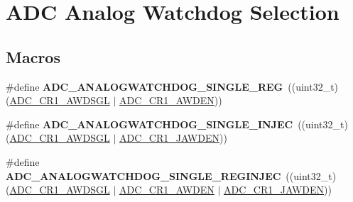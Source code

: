 \hypertarget{group___a_d_c__analog__watchdog__selection}{}\section{A\+DC Analog Watchdog Selection}
\label{group___a_d_c__analog__watchdog__selection}
\subsection*{Macros}
\begin{DoxyCompactItemize}
\item 
\mbox{\label{group___a_d_c__analog__watchdog__selection_gad4cf176e721fd2382fbc7937e352db67}} 
\#define {\bfseries A\+D\+C\+\_\+\+A\+N\+A\+L\+O\+G\+W\+A\+T\+C\+H\+D\+O\+G\+\_\+\+S\+I\+N\+G\+L\+E\+\_\+\+R\+EG}~((uint32\+\_\+t)(\mbox{\hyperlink{group___peripheral___registers___bits___definition_ga5c9fc31f19c04033dfa98e982519c451}{A\+D\+C\+\_\+\+C\+R1\+\_\+\+A\+W\+D\+S\+GL}} $\vert$ \mbox{\hyperlink{group___peripheral___registers___bits___definition_ga6e006d43fcb9fe1306745c95a1bdd651}{A\+D\+C\+\_\+\+C\+R1\+\_\+\+A\+W\+D\+EN}}))
\item 
\mbox{\label{group___a_d_c__analog__watchdog__selection_ga47d8850a833f799ceb433491a3d6659c}} 
\#define {\bfseries A\+D\+C\+\_\+\+A\+N\+A\+L\+O\+G\+W\+A\+T\+C\+H\+D\+O\+G\+\_\+\+S\+I\+N\+G\+L\+E\+\_\+\+I\+N\+J\+EC}~((uint32\+\_\+t)(\mbox{\hyperlink{group___peripheral___registers___bits___definition_ga5c9fc31f19c04033dfa98e982519c451}{A\+D\+C\+\_\+\+C\+R1\+\_\+\+A\+W\+D\+S\+GL}} $\vert$ \mbox{\hyperlink{group___peripheral___registers___bits___definition_ga4886de74bcd3a1e545094089f76fd0b3}{A\+D\+C\+\_\+\+C\+R1\+\_\+\+J\+A\+W\+D\+EN}}))
\item 
\mbox{\label{group___a_d_c__analog__watchdog__selection_gaa0c246b49622fa85c7df6e11f583dffb}} 
\#define {\bfseries A\+D\+C\+\_\+\+A\+N\+A\+L\+O\+G\+W\+A\+T\+C\+H\+D\+O\+G\+\_\+\+S\+I\+N\+G\+L\+E\+\_\+\+R\+E\+G\+I\+N\+J\+EC}~((uint32\+\_\+t)(\mbox{\hyperlink{group___peripheral___registers___bits___definition_ga5c9fc31f19c04033dfa98e982519c451}{A\+D\+C\+\_\+\+C\+R1\+\_\+\+A\+W\+D\+S\+GL}} $\vert$ \mbox{\hyperlink{group___peripheral___registers___bits___definition_ga6e006d43fcb9fe1306745c95a1bdd651}{A\+D\+C\+\_\+\+C\+R1\+\_\+\+A\+W\+D\+EN}} $\vert$ \mbox{\hyperlink{group___peripheral___registers___bits___definition_ga4886de74bcd3a1e545094089f76fd0b3}{A\+D\+C\+\_\+\+C\+R1\+\_\+\+J\+A\+W\+D\+EN}}))

\end{DoxyCompactItemize}
